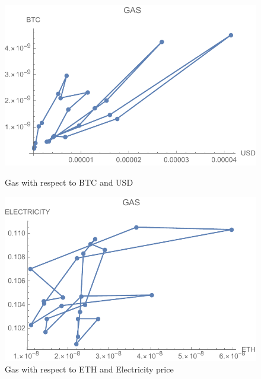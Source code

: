 \begin{figure}[!htb]
	\includegraphics[width=\linewidth]{figures/gas.pdf}
	\caption{Gas with respect to BTC and USD}\label{fig:gas}
	\endminipage\hfill
	\includegraphics[width=\linewidth]{figures/gasElectricity.pdf}
	\caption{Gas with respect to ETH and Electricity price}\label{fig:gasElectricity}
	\endminipage\hfill
\end{figure}
